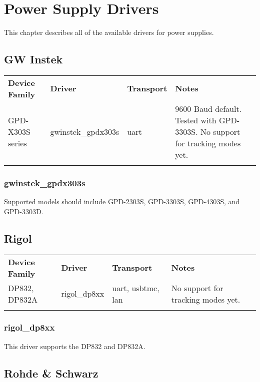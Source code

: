 \chapter{Power Supply Drivers}
\label{sec:powersupply-drivers}

This chapter describes all of the available drivers for power supplies.

\section{GW Instek}

\begin{tabularx}{16cm}{lllX}
\thickhline
\textbf{Device Family} & \textbf{Driver} & \textbf{Transport} & \textbf{Notes} \\
\thickhline
GPD-X303S series & gwinstek\_gpdx303s & uart & 9600 Baud default. Tested with GPD-3303S. No support for tracking modes yet.\\
\thickhline
\end{tabularx}

\subsection{gwinstek\_gpdx303s}

Supported models should include GPD-2303S, GPD-3303S, GPD-4303S, and GPD-3303D.

\section{Rigol}

\begin{tabularx}{16cm}{lllX}
\thickhline
\textbf{Device Family} & \textbf{Driver} & \textbf{Transport} & \textbf{Notes} \\
\thickhline
DP832, DP832A & rigol\_dp8xx & uart, usbtmc, lan & No support for tracking modes yet.\\
\thickhline
\end{tabularx}

\subsection{rigol\_dp8xx}

This driver supports the DP832 and DP832A.

\section{Rohde \& Schwarz}

